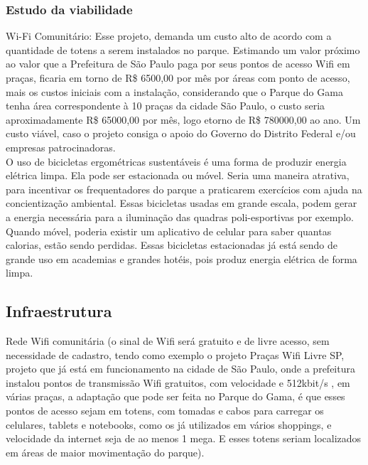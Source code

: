 \subsubsection{Estudo da viabilidade}

Wi-Fi Comunit\'ario: Esse projeto, demanda um custo alto de acordo com a quantidade de totens a serem instalados no parque. Estimando um valor pr\'oximo ao valor que a Prefeitura de S\~ao Paulo paga por seus pontos de acesso Wifi em pra\c{c}as, ficaria em torno de R\$ 6500,00 por m\^es por \'areas com ponto de acesso, mais os custos iniciais com a instala\c{c}\~ao, considerando que o Parque do Gama tenha \'area correspondente \`a 10 pra\c{c}as da cidade S\~ao Paulo, o custo seria aproximadamente R\$ 65000,00 por m\^es, logo etorno de R\$ 780000,00 ao ano. Um custo vi\'avel, caso o projeto consiga o apoio do Governo do Distrito Federal e/ou empresas patrocinadoras. \\ O uso de bicicletas ergom\'etricas sustent\'aveis \'e uma forma de produzir energia el\'etrica limpa. Ela pode ser estacionada ou m\'ovel. Seria uma maneira atrativa, para incentivar os frequentadores do parque a praticarem exerc\'icios com ajuda na concientiza\c{c}\~ao ambiental. Essas bicicletas usadas em grande escala, podem gerar a energia necess\'aria para a ilumina\c{c}\~ao das quadras poli-esportivas por exemplo. Quando m\'ovel, poderia existir um aplicativo de celular para saber quantas calorias, est\~ao sendo perdidas. Essas bicicletas estacionadas j\'a est\'a sendo de grande uso em academias e grandes hot\'eis, pois produz energia el\'etrica de forma limpa.

\subsection{Infraestrutura}

Rede Wifi comunit\'aria (o sinal de Wifi ser\'a gratuito e de livre acesso, sem necessidade de cadastro, tendo como exemplo o projeto Pra\c{c}as Wifi Livre SP, projeto que j\'a est\'a em funcionamento na cidade de S\~ao Paulo, onde a prefeitura instalou pontos de transmiss\~ao Wifi gratuitos, com velocidade e 512kbit/s , em v\'arias pra\c{c}as, a adapta\c{c}\~ao que pode ser feita no Parque do Gama, \'e que esses pontos de acesso sejam em totens, com tomadas e cabos para carregar os celulares, tablets e notebooks, como os j\'a utilizados em v\'arios shoppings, e velocidade da internet seja de ao menos 1 mega. E esses totens seriam localizados em \'areas de maior movimenta\c{c}\~ao do parque). 

